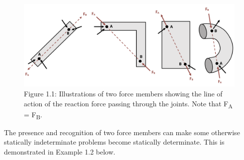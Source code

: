 \documentclass[
  letterpaper,
  DIV=11,
  numbers=noendperiod]{scrreprt}
\begin{document}
\begin{figure}[H]

{\centering \includegraphics[width=6.6875in,height=\textheight]{images/CH1 PNGs/figure 1.1.png}

}

\caption{Figure 1.1: Illustrations of two force members showing the line
of action of the reaction force passing through the joints. Note that
F\textsubscript{A} = F\textsubscript{B}.}

\end{figure}%

The presence and recognition of two force members can make some
otherwise statically indeterminate problems become statically
determinate. This is demonstrated in Example 1.2 below.
\end{document}
